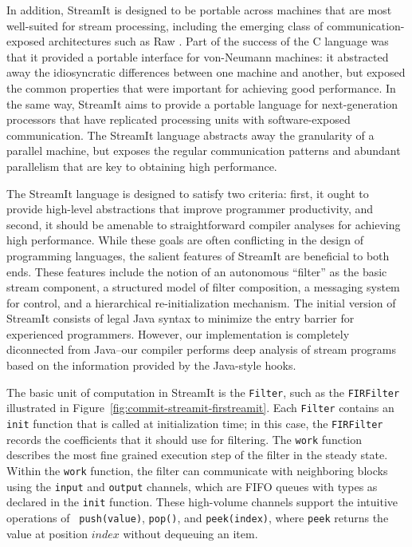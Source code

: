 In addition, StreamIt is designed to be portable across machines that
are most well-suited for stream processing, including the emerging
class of communication-exposed architectures such as Raw
\cite{rawshort}.  Part of the success of the C language was that it
provided a portable interface for von-Neumann machines: it abstracted
away the idiosyncratic differences between one machine and another,
but exposed the common properties that were important for achieving
good performance.  In the same way, StreamIt aims to provide a
portable language for next-generation processors that have replicated
processing units with software-exposed communication.  The StreamIt
language abstracts away the granularity of a parallel machine, but
exposes the regular communication patterns and abundant parallelism
that are key to obtaining high performance.

The StreamIt language is designed to satisfy two criteria: first, it
ought to provide high-level abstractions that improve programmer
productivity, and second, it should be amenable to straightforward
compiler analyses for achieving high performance.  While these goals
are often conflicting in the design of programming languages, the
salient features of StreamIt are beneficial to both ends.  These
features include the notion of an autonomous ``filter'' as the basic
stream component, a structured model of filter composition, a
messaging system for control, and a hierarchical re-initialization
mechanism.  The initial version of StreamIt consists of legal Java
syntax to minimize the entry barrier for experienced programmers.
However, our implementation is completely diconnected from Java--our
compiler performs deep analysis of stream programs based on the
information provided by the Java-style hooks.

The basic unit of computation in StreamIt is the {\tt Filter}, such as
the {\tt FIRFilter} illustrated in
Figure~\ref{fig:commit-streamit-firstreamit}.  Each {\tt Filter}
contains an {\tt init} function that is called at initialization time;
in this case, the {\tt FIRFilter} records the coefficients that it
should use for filtering.  The {\tt work} function describes the most
fine grained execution step of the filter in the steady state.  Within
the {\tt work} function, the filter can communicate with neighboring
blocks using the {\tt input} and {\tt output} channels, which are FIFO
queues with types as declared in the {\tt init} function.  These
high-volume channels support the intuitive operations of {\tt
push(value)}, {\tt pop()}, and {\tt peek(index)}, where {\tt peek}
returns the value at position $index$ without dequeuing an item.


